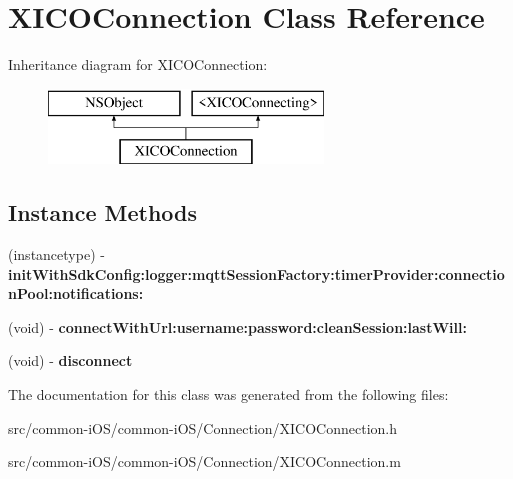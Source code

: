 \hypertarget{interface_x_i_c_o_connection}{}\section{X\+I\+C\+O\+Connection Class Reference}
\label{interface_x_i_c_o_connection}
Inheritance diagram for X\+I\+C\+O\+Connection\+:\begin{figure}[H]
\begin{center}
\leavevmode
\includegraphics[height=2.000000cm]{interface_x_i_c_o_connection}
\end{center}
\end{figure}
\subsection*{Instance Methods}
\begin{DoxyCompactItemize}
\item 
\hypertarget{interface_x_i_c_o_connection_ab2515b12fd7e224a1f6a3f373d967f1e}{}\label{interface_x_i_c_o_connection_ab2515b12fd7e224a1f6a3f373d967f1e} 
(instancetype) -\/ {\bfseries init\+With\+Sdk\+Config\+:logger\+:mqtt\+Session\+Factory\+:timer\+Provider\+:connection\+Pool\+:notifications\+:}
\item 
\hypertarget{interface_x_i_c_o_connection_a5badc7a081eb031c4cc51eb72b9fc73a}{}\label{interface_x_i_c_o_connection_a5badc7a081eb031c4cc51eb72b9fc73a} 
(void) -\/ {\bfseries connect\+With\+Url\+:username\+:password\+:clean\+Session\+:last\+Will\+:}
\item 
\hypertarget{interface_x_i_c_o_connection_ac939c5e9b891673f755fe49d43f5a9b4}{}\label{interface_x_i_c_o_connection_ac939c5e9b891673f755fe49d43f5a9b4} 
(void) -\/ {\bfseries disconnect}
\end{DoxyCompactItemize}


The documentation for this class was generated from the following files\+:\begin{DoxyCompactItemize}
\item 
src/common-\/i\+O\+S/common-\/i\+O\+S/\+Connection/X\+I\+C\+O\+Connection.\+h\item 
src/common-\/i\+O\+S/common-\/i\+O\+S/\+Connection/X\+I\+C\+O\+Connection.\+m\end{DoxyCompactItemize}
